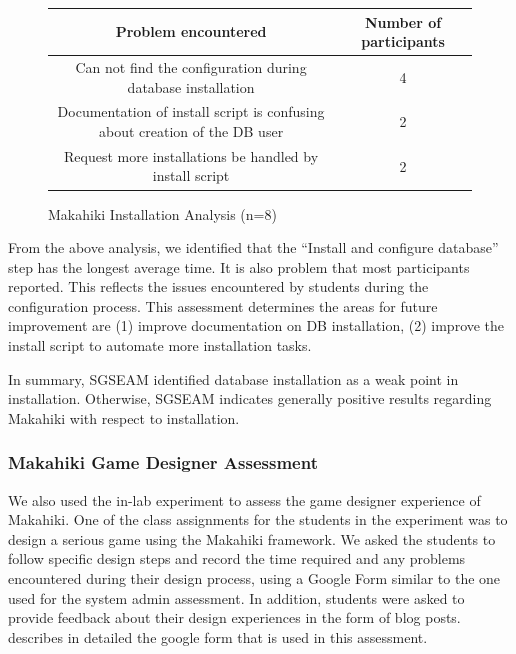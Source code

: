 \documentclass{sigchi}
\newcommand\tabhead[1]{\small\textbf{#1}}
\begin{document}
\begin{figure}[ht!]
  \centering
  \begin{tabular}{|c|c|}
    \hline
    \multicolumn{1}{|p{0.7\columnwidth}|}{\centering\tabhead{Problem encountered}} &
    \multicolumn{1}{|p{0.2\columnwidth}|}{\centering\tabhead{Number of participants}} \\
    \hline
    \multicolumn{1}{|p{0.7\columnwidth}|}{Can not find the configuration during database installation } &
    \multicolumn{1}{|p{0.2\columnwidth}|}{4} \\
    \hline
    \multicolumn{1}{|p{0.7\columnwidth}|}{Documentation of install script is confusing about creation of the DB user} &
    \multicolumn{1}{|p{0.2\columnwidth}|}{2} \\
    \hline
    \multicolumn{1}{|p{0.7\columnwidth}|}{Request more installations be handled by install script } &
    \multicolumn{1}{|p{0.2\columnwidth}|}{2} \\
    \hline
  \end{tabular}
  \caption{Makahiki Installation Analysis (n=8)}
  \label{fig:makahiki-install}
\end{figure}


From the above analysis, we identified that the ``Install and configure database'' step has the
longest average time. It is also problem that most participants reported. This reflects the issues
encountered by students during the configuration process. This assessment determines the areas for future
improvement are (1) improve documentation on DB installation, (2)  improve the install script to automate
more installation tasks.

In summary, SGSEAM identified database installation as a weak point in
installation.  Otherwise, SGSEAM indicates generally positive results regarding
Makahiki with respect to installation. 

\subsubsection{Makahiki Game Designer Assessment}

We also used the in-lab experiment to assess the game
designer experience of Makahiki. One of the class assignments for the students in the
experiment was to design a serious game using the Makahiki framework. We asked the students
to follow specific design steps and record the time required and any problems encountered during
their design process, using a Google Form similar to the one used for the system admin
assessment. In addition, students were asked to provide feedback about their
design experiences in the form of blog posts. \cite{csdl2-13-04} describes in detailed
the google form that is used in this assessment.
\end{document}
